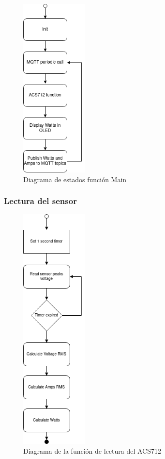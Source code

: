 \begin{titlepage}
\begin{figure}[h!]
	\centering
	\includegraphics[width=0.30\textwidth]{imagenes/main.drawio.png}
	\caption{Diagrama de estados función Main}
\end{figure}
\newpage
\subsubsection{Lectura del sensor}
\begin{figure}[h!]
	\centering
	\includegraphics[width=0.30\textwidth]{imagenes/acs712.drawio.png}
	\caption{Diagrama de la función de lectura del ACS712}
\end{figure}
\newpage

\end{titlepage}

